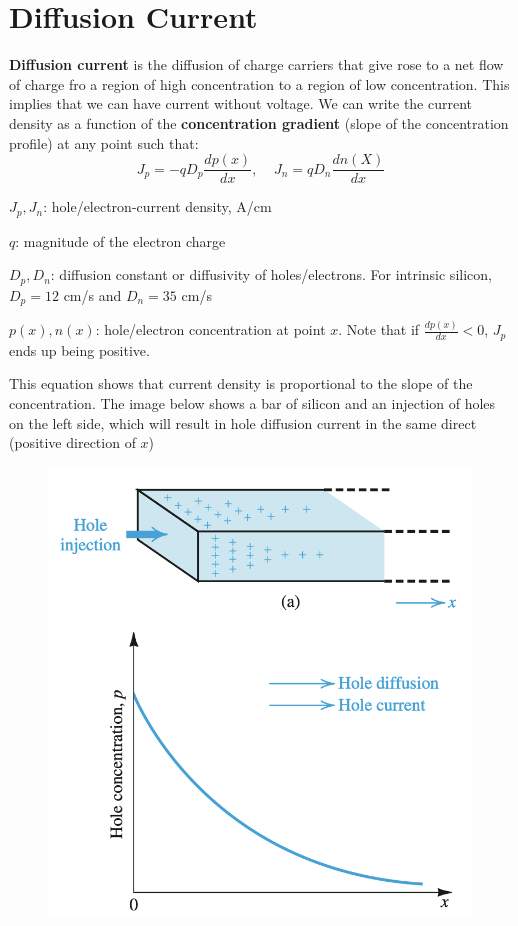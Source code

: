\section{Diffusion Current}
\textbf{Diffusion current} is the diffusion of charge carriers that give rose to a net flow of charge fro a region of high concentration to a region of low concentration. This implies that we can have current without voltage. We can write the current density as a function of the \textbf{concentration gradient} (slope of the concentration profile) at any point such that:
    \[J_p = -q D_p \frac{dp(x)}{dx}, ~~~~~ J_n = q D_n \frac{dn(X)}{dx}\]
\begin{gline}
    \item $J_p, J_n$: hole/electron-current density, A/cm\sq
    \item $q$: magnitude of the electron charge
    \item $D_p, D_n$: diffusion constant or diffusivity of holes/electrons. For intrinsic silicon, $D_p = 12$ cm\sq/s and $D_n = 35$ cm\sq/s
    \item $p(x), n(x)$: hole/electron concentration at point $x$. Note that if $\frac{dp(x)}{dx} < 0$, $J_p$ ends up being positive.
\end{gline}
This equation shows that current density is proportional to the slope of the concentration.
The image below shows a bar of silicon and an injection of holes on the left side, which will result in hole diffusion current in the same direct (positive direction of $x$)

\begin{figure}[H]
    \centering
    \includegraphics[scale=0.5]{figs/ch02/diffusion_current.png}
\end{figure}

